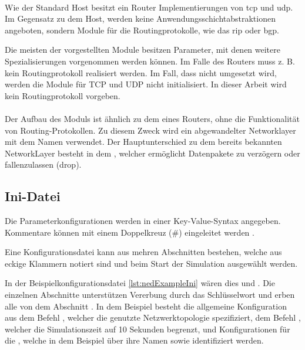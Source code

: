 \paragraph{}
Wie der Standard Host besitzt ein Router Implementierungen von \gls{tcp} und \gls{udp}. Im Gegensatz zu dem Host, werden keine Anwendungsschichtabstraktionen angeboten, sondern Module für die Routingprotokolle, wie \zB das \gls{rip} oder \gls{bgp}. 

Die meisten der vorgestellten Module besitzen Parameter, mit denen weitere Spezialisierungen vorgenommen werden können. Im Falle des Routers muss z. B. kein Routingprotokoll realisiert werden. Im Fall, dass  nicht umgesetzt wird, werden die Module für TCP und UDP nicht initialisiert. In dieser Arbeit wird kein Routingprotokoll vorgeben.

\paragraph{}
Der Aufbau des Moduls  ist ähnlich zu dem eines Routers, ohne die Funktionalität von Routing-Protokollen. Zu diesem Zweck wird ein abgewandelter Networklayer mit dem Namen  verwendet. Der Hauptunterschied zu dem bereits bekannten NetworkLayer besteht in dem , welcher ermöglicht Datenpakete zu verzögern oder fallenzulassen (drop).

\subsection{Ini-Datei}
Die Parameterkonfigurationen werden in einer Key-Value-Syntax angegeben. Kommentare können mit einem Doppelkreuz (\#) eingeleitet werden \cite[]{OmnetManual}. 

Eine Konfigurationsdatei kann aus mehren Abschnitten bestehen, welche aus eckige Klammern notiert sind und beim Start der Simulation ausgewählt werden.
\begin{program}[ht]
	}]{listings/example.ini}
	\caption[Beispielkonfiguration]{Konfigurationdatei für das Beispielnetzwerk}
	\label{lst:nedExampleIni}
\end{program}
In der Beispielkonfigurationsdatei \ref{lst:nedExampleIni} wären dies \ini{[General]} und . Die einzelnen Abschnitte unterstützen Vererbung durch das Schlüsselwort  und erben alle von dem Abschnitt  \cite[]{OmnetManual}. In dem Beispiel besteht die allgemeine Konfiguration aus dem Befehl , welcher die genutzte Netzwerktopologie spezifiziert, dem Befehl , welcher die Simulationszeit auf 10 Sekunden begrenzt, und Konfigurationen für die , welche in dem Beispiel über ihre Namen  sowie  identifiziert werden.

